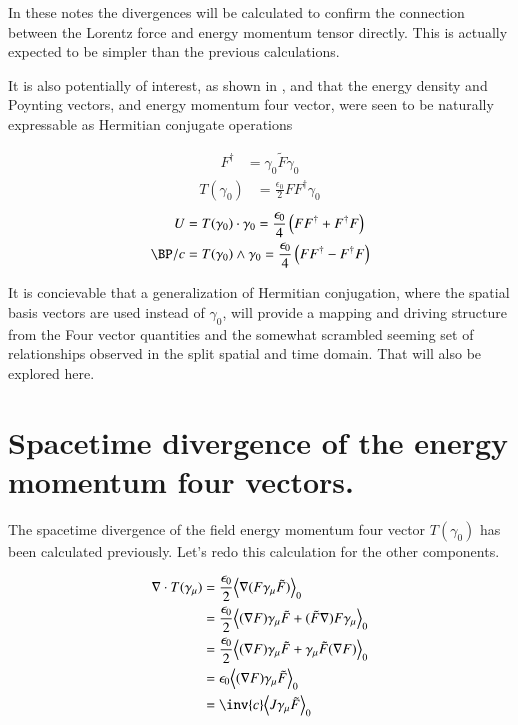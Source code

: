 \documentclass{article}
\begin{document}
In these notes the divergences will be calculated to confirm the
connection between the Lorentz force and energy momentum tensor directly.
This is actually expected to be simpler than the previous calculations.

It is also 
potentially of interest, as shown in \cite{PJFourierVacuum}, and
\cite{PJplaneWave}
that the energy density and Poynting vectors, and energy momentum four vector,
were seen to be naturally expressable as Hermitian conjugate operations

\begin{align}
F^\dagger &= \gamma_0 \tilde{F} \gamma_0
\end{align}
\begin{align}
T(\gamma_0) &= \frac{\epsilon_0}{2} F F^\dagger \gamma_0
\end{align}
\begin{align}
U &= T(\gamma_0) \cdot \gamma_0 = \frac{\epsilon_0}{4} \left(F F^\dagger + F^\dagger F \right) \\
\BP/c &= T(\gamma_0) \wedge \gamma_0 = \frac{\epsilon_0}{4} \left(F F^\dagger - F^\dagger F \right)
\end{align}

It is concievable that a generalization of Hermitian conjugation, where the spatial basis vectors are used instead of $\gamma_0$, will 
provide a mapping and driving structure from the Four vector quantities and the somewhat scrambled seeming set
of relationships observed in the split spatial and time domain.  That will also be explored here.

\section{ Spacetime divergence of the energy momentum four vectors. }

The spacetime divergence of the field energy momentum four vector $T(\gamma_0)$ has been calculated previously.  Let's redo this 
calculation for the other components.

\begin{align*}
\grad \cdot T(\gamma_\mu) 
&= \frac{\epsilon_0}{2} \gpgradezero{ \grad (F \gamma_\mu \tilde{F}) } \\
&= \frac{\epsilon_0}{2} \gpgradezero{ (\grad F) \gamma_\mu \tilde{F} + (\tilde{F} \grad) F \gamma_\mu } \\
&= \frac{\epsilon_0}{2} \gpgradezero{ (\grad F) \gamma_\mu \tilde{F} + \gamma_\mu \tilde{F} (\grad F) } \\
&= {\epsilon_0} \gpgradezero{ (\grad F) \gamma_\mu \tilde{F} } \\
&= \inv{c} \gpgradezero{ J \gamma_\mu \tilde{F} } \\
\end{align*}
\end{document}
